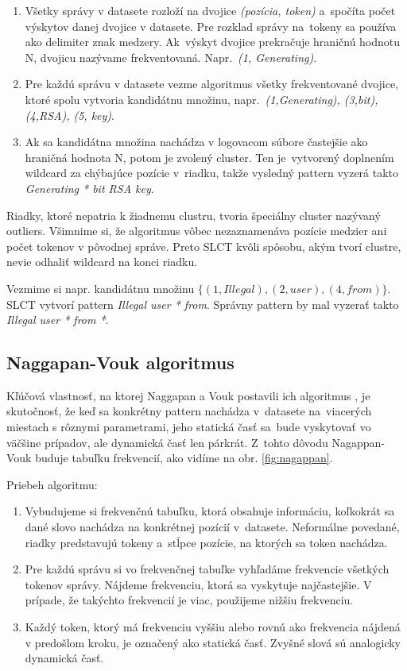 \begin{enumerate}
  \item Všetky správy v datasete rozloží na dvojice \emph{(pozícia, token)} a~spo\-čí\-ta počet výskytov danej dvojice v datasete. Pre rozklad správy na~tokeny sa používa ako delimiter znak medzery. Ak~výskyt dvojice prekračuje hraničnú hodnotu N, dvojicu nazývame frek\-ventovaná. Napr.~\emph{(1, Generating)}.
  \item Pre každú správu v datasete vezme algoritmus všetky frek\-ventované dvojice, ktoré spolu vytvoria kandidátnu množinu, napr.~\emph{{(1,Generating), (3,bit), (4,RSA), (5, key)}}. 
  \item Ak sa kandidátna množina nachádza v logovacom súbore častejšie ako hraničná hodnota N, potom je zvolený cluster. Ten je~vyt\-vorený doplnením wildcard za chýbajúce pozície v~riad\-ku, takže vysledný pattern vyzerá takto \emph{Generating * bit RSA key}.
\end{enumerate}

Riadky, ktoré nepatria k žiadnemu clustru, tvoria špeciálny cluster nazývaný outliers. Všimnime si, že algoritmus vôbec nezaznamenáva pozície medzier ani počet tokenov v pôvodnej správe. Preto SLCT kvôli spôsobu, akým tvorí clustre, nevie odhaliť wildcard na konci riadku. 
\par Vezmime si napr. kandidátnu množinu $\{(1,Illegal), (2,user), (4,from)\} $. SLCT vytvorí pattern \emph{Illegal user * from}. Správny pattern by mal vyzerať takto  \emph{Illegal user * from *}.

\subsection{Naggapan-Vouk algoritmus}
Kľúčová vlastnosť, na ktorej Naggapan a Vouk postavili ich algoritmus \parencite{nagappanvouk}, je skutočnosť, že keď sa konkrétny pattern nachádza v~datasete na~viacerých miestach s rôznymi parametrami, jeho statická časť sa~bude vyskytovať vo väčšine prípadov, ale dynamická časť len párkrát. Z~tohto dôvodu Nagappan-Vouk buduje tabuľku frekvencií, ako vidíme na obr. \ref{fig:nagappan}. 
\par Priebeh algoritmu:

\begin{enumerate}
  \item Vybudujeme si frekvenčnú tabuľku, ktorá obsahuje informáciu, koľkokrát sa dané slovo nachádza na konkrétnej pozícií v~datasete. Neformálne povedané, riadky predstavujú tokeny a~stĺpce pozície, na ktorých sa token nachádza.
  \item Pre každú správu si vo frekvenčnej tabuľke vyhľadáme frekvencie všetkých tokenov správy. Nájdeme frekvenciu, ktorá sa vyskytuje najčastejšie. V prípade, že takýchto frekvencií je viac, použijeme nižšiu frekvenciu.
  \item Každý token, ktorý má frekvenciu vyššiu alebo rovnú ako frekvencia nájdená v predošlom kroku, je označený ako statická časť. Zvyšné slová sú analogicky dynamická časť.
\end{enumerate}

